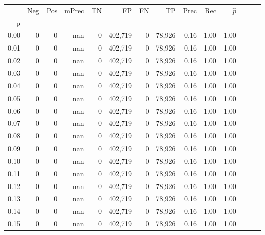 \begin{tabular}{rrrrrrrrrrrrrr}
\toprule
{} &      Neg &     Pos & mPrec &       TN &       FP &      FN &      TP &  Prec &   Rec & $\hat{p}$ \\
p    &          &         &       &          &          &         &         &       &       &           \\
\midrule
0.00 &        0 &       0 &   nan &        0 &  402,719 &       0 &  78,926 &  0.16 &  1.00 &      1.00 \\
0.01 &        0 &       0 &   nan &        0 &  402,719 &       0 &  78,926 &  0.16 &  1.00 &      1.00 \\
0.02 &        0 &       0 &   nan &        0 &  402,719 &       0 &  78,926 &  0.16 &  1.00 &      1.00 \\
0.03 &        0 &       0 &   nan &        0 &  402,719 &       0 &  78,926 &  0.16 &  1.00 &      1.00 \\
0.04 &        0 &       0 &   nan &        0 &  402,719 &       0 &  78,926 &  0.16 &  1.00 &      1.00 \\
0.05 &        0 &       0 &   nan &        0 &  402,719 &       0 &  78,926 &  0.16 &  1.00 &      1.00 \\
0.06 &        0 &       0 &   nan &        0 &  402,719 &       0 &  78,926 &  0.16 &  1.00 &      1.00 \\
0.07 &        0 &       0 &   nan &        0 &  402,719 &       0 &  78,926 &  0.16 &  1.00 &      1.00 \\
0.08 &        0 &       0 &   nan &        0 &  402,719 &       0 &  78,926 &  0.16 &  1.00 &      1.00 \\
0.09 &        0 &       0 &   nan &        0 &  402,719 &       0 &  78,926 &  0.16 &  1.00 &      1.00 \\
0.10 &        0 &       0 &   nan &        0 &  402,719 &       0 &  78,926 &  0.16 &  1.00 &      1.00 \\
0.11 &        0 &       0 &   nan &        0 &  402,719 &       0 &  78,926 &  0.16 &  1.00 &      1.00 \\
0.12 &        0 &       0 &   nan &        0 &  402,719 &       0 &  78,926 &  0.16 &  1.00 &      1.00 \\
0.13 &        0 &       0 &   nan &        0 &  402,719 &       0 &  78,926 &  0.16 &  1.00 &      1.00 \\
0.14 &        0 &       0 &   nan &        0 &  402,719 &       0 &  78,926 &  0.16 &  1.00 &      1.00 \\
0.15 &        0 &       0 &   nan &        0 &  402,719 &       0 &  78,926 &  0.16 &  1.00 &      1.00 \\

\end{tabular}

